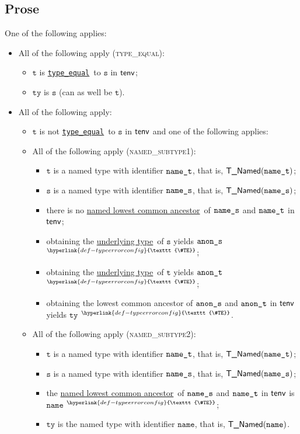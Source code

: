 \documentclass{book}
\newcommand\TypeErrorConfig[0]{\hyperlink{def-typeerrorconfig}{\texttt{\#TE}}}
\newcommand\ProseOrTypeError[0]{\hyperlink{def-proseortypeerror}{$^{\TypeErrorConfig}$}}
\newcommand\typeequal[0]{\hyperlink{def-typeequal}{\texttt{type\_equal}}}
\newcommand\underlyingtype[0]{\hyperlink{def-underlyingtype}{underlying type}}
\newcommand\namedlowestcommonancestor[0]{\hyperlink{def-namedlowestcommonancestor}{named lowest common ancestor}}
\newcommand\vt[0]{\texttt{t}}
\newcommand\vs[0]{\texttt{s}}
\newcommand\tty[0]{\texttt{ty}}
\newcommand\name[0]{\texttt{name}}
\begin{document}
\subsection{Prose}
One of the following applies:
\begin{itemize}
  \item All of the following apply (\textsc{type\_equal}):
  \begin{itemize}
    \item $\vt$ is \typeequal\ to $\vs$ in $\textsf{tenv}$;
    \item $\tty$ is $\vs$ (can as well be $\vt$).
  \end{itemize}

  \item All of the following apply:
  \begin{itemize}
    \item $\vt$ is not \typeequal\ to $\vs$ in $\textsf{tenv}$ and one of the following applies:

    \item All of the following apply (\textsc{named\_subtype1}):
    \begin{itemize}
      \item $\vt$ is a named type with identifier $\texttt{name\_t}$, that is, $\textsf{T\_Named}(\texttt{name\_t})$;
      \item $\vs$ is a named type with identifier $\texttt{name\_s}$, that is, $\textsf{T\_Named}(\texttt{name\_s})$;
      \item there is no \namedlowestcommonancestor\ of $\texttt{name\_s}$ and $\texttt{name\_t}$ in $\textsf{tenv}$;
      \item obtaining the \underlyingtype\ of $\vs$ yields $\texttt{anon\_s}$ \ProseOrTypeError;
      \item obtaining the \underlyingtype\ of $\vt$ yields $\texttt{anon\_t}$ \ProseOrTypeError;
      \item obtaining the lowest common ancestor of $\texttt{anon\_s}$ and $\texttt{anon\_t}$ in $\textsf{tenv}$ yields $\tty$ \ProseOrTypeError.
    \end{itemize}

    \item All of the following apply (\textsc{named\_subtype2}):
    \begin{itemize}
      \item $\vt$ is a named type with identifier $\texttt{name\_t}$, that is, $\textsf{T\_Named}(\texttt{name\_t})$;
      \item $\vs$ is a named type with identifier $\texttt{name\_s}$, that is, $\textsf{T\_Named}(\texttt{name\_s})$;
      \item the \namedlowestcommonancestor\ of $\texttt{name\_s}$ and $\texttt{name\_t}$ in $\textsf{tenv}$ is $\name$ \ProseOrTypeError;
      \item $\tty$ is the named type with identifier $\name$, that is, $\TNamed(\name)$.
    \end{itemize}


\end{itemize}
\end{itemize}
\end{document}
